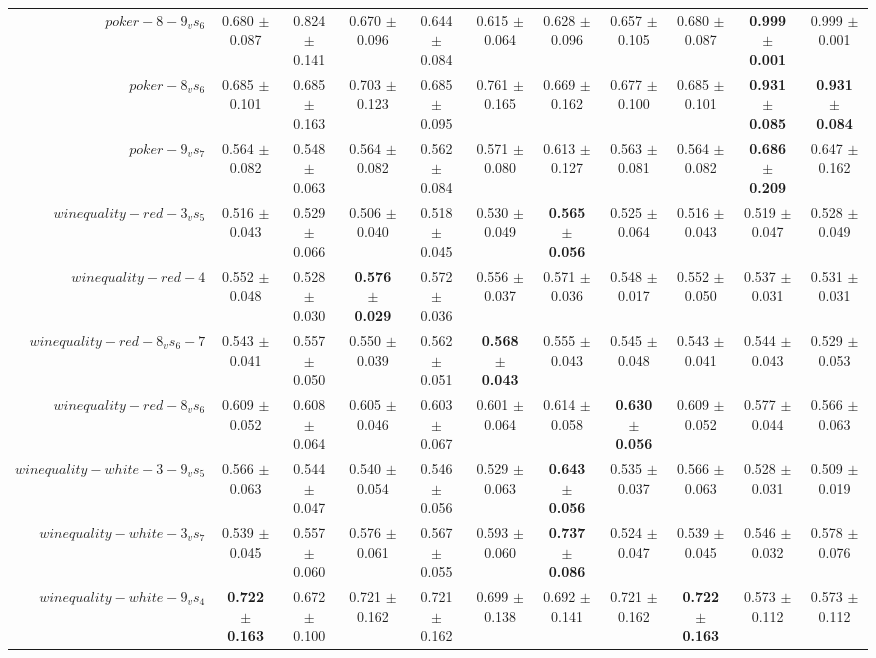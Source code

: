 \begin{table}[!ht]
{\begin{tabular}{r c c c c c c c c c c}
$poker-8-9_vs_6$ & 0.680 $\pm$ 0.087 & 0.824 $\pm$ 0.141 & 0.670 $\pm$ 0.096 & 0.644 $\pm$ 0.084 & 0.615 $\pm$ 0.064 & 0.628 $\pm$ 0.096 & 0.657 $\pm$ 0.105 & 0.680 $\pm$ 0.087 & \textbf{0.999 $\pm$ 0.001} & 0.999 $\pm$ 0.001 \\
$poker-8_vs_6$ & 0.685 $\pm$ 0.101 & 0.685 $\pm$ 0.163 & 0.703 $\pm$ 0.123 & 0.685 $\pm$ 0.095 & 0.761 $\pm$ 0.165 & 0.669 $\pm$ 0.162 & 0.677 $\pm$ 0.100 & 0.685 $\pm$ 0.101 & \textbf{0.931 $\pm$ 0.085} & \textbf{0.931 $\pm$ 0.084} \\
$poker-9_vs_7$ & 0.564 $\pm$ 0.082 & 0.548 $\pm$ 0.063 & 0.564 $\pm$ 0.082 & 0.562 $\pm$ 0.084 & 0.571 $\pm$ 0.080 & 0.613 $\pm$ 0.127 & 0.563 $\pm$ 0.081 & 0.564 $\pm$ 0.082 & \textbf{0.686 $\pm$ 0.209} & 0.647 $\pm$ 0.162 \\
$winequality-red-3_vs_5$ & 0.516 $\pm$ 0.043 & 0.529 $\pm$ 0.066 & 0.506 $\pm$ 0.040 & 0.518 $\pm$ 0.045 & 0.530 $\pm$ 0.049 & \textbf{0.565 $\pm$ 0.056} & 0.525 $\pm$ 0.064 & 0.516 $\pm$ 0.043 & 0.519 $\pm$ 0.047 & 0.528 $\pm$ 0.049 \\
$winequality-red-4$ & 0.552 $\pm$ 0.048 & 0.528 $\pm$ 0.030 & \textbf{0.576 $\pm$ 0.029} & 0.572 $\pm$ 0.036 & 0.556 $\pm$ 0.037 & 0.571 $\pm$ 0.036 & 0.548 $\pm$ 0.017 & 0.552 $\pm$ 0.050 & 0.537 $\pm$ 0.031 & 0.531 $\pm$ 0.031 \\
$winequality-red-8_vs_6-7$ & 0.543 $\pm$ 0.041 & 0.557 $\pm$ 0.050 & 0.550 $\pm$ 0.039 & 0.562 $\pm$ 0.051 & \textbf{0.568 $\pm$ 0.043} & 0.555 $\pm$ 0.043 & 0.545 $\pm$ 0.048 & 0.543 $\pm$ 0.041 & 0.544 $\pm$ 0.043 & 0.529 $\pm$ 0.053 \\
$winequality-red-8_vs_6$ & 0.609 $\pm$ 0.052 & 0.608 $\pm$ 0.064 & 0.605 $\pm$ 0.046 & 0.603 $\pm$ 0.067 & 0.601 $\pm$ 0.064 & 0.614 $\pm$ 0.058 & \textbf{0.630 $\pm$ 0.056} & 0.609 $\pm$ 0.052 & 0.577 $\pm$ 0.044 & 0.566 $\pm$ 0.063 \\
$winequality-white-3-9_vs_5$ & 0.566 $\pm$ 0.063 & 0.544 $\pm$ 0.047 & 0.540 $\pm$ 0.054 & 0.546 $\pm$ 0.056 & 0.529 $\pm$ 0.063 & \textbf{0.643 $\pm$ 0.056} & 0.535 $\pm$ 0.037 & 0.566 $\pm$ 0.063 & 0.528 $\pm$ 0.031 & 0.509 $\pm$ 0.019 \\
$winequality-white-3_vs_7$ & 0.539 $\pm$ 0.045 & 0.557 $\pm$ 0.060 & 0.576 $\pm$ 0.061 & 0.567 $\pm$ 0.055 & 0.593 $\pm$ 0.060 & \textbf{0.737 $\pm$ 0.086} & 0.524 $\pm$ 0.047 & 0.539 $\pm$ 0.045 & 0.546 $\pm$ 0.032 & 0.578 $\pm$ 0.076 \\
$winequality-white-9_vs_4$ & \textbf{0.722 $\pm$ 0.163} & 0.672 $\pm$ 0.100 & 0.721 $\pm$ 0.162 & 0.721 $\pm$ 0.162 & 0.699 $\pm$ 0.138 & 0.692 $\pm$ 0.141 & 0.721 $\pm$ 0.162 & \textbf{0.722 $\pm$ 0.163} & 0.573 $\pm$ 0.112 & 0.573 $\pm$ 0.112 \\

\end{tabular}}
\end{table}
